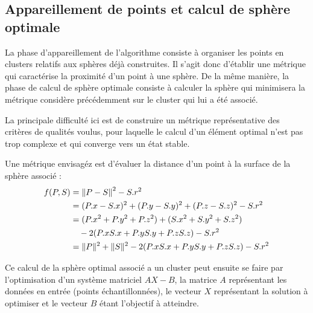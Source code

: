 \documentclass[10pt,a4paper,twoside, twocolumn]{report}
\begin{document}
\subsection{Appareillement de points et calcul de sphère optimale}

La phase d'appareillement de l'algorithme consiste à organiser les points en clusters relatifs aux sphères déjà construites. Il s’agit donc d’établir une métrique qui caractérise la proximité d'un point à une sphère. De la même manière, la phase de calcul de sphère optimale consiste à calculer la sphère qui minimisera la métrique considère précédemment sur le cluster qui lui a été associé.

La principale difficulté ici est de construire un métrique représentative des critères de qualités voulus, pour laquelle le calcul d'un élément optimal n'est pas trop complexe et qui converge vers un état stable.

Une métrique envisagéz est d'évaluer la distance d'un point à la surface de la sphère associé :
\begin{align}
	f(P, S) &= \left\|P-S\right\|^2 - S.r^2															\label{eq:metrique}	\\
					&= (P.x-S.x)^2 + (P.y-S.y)^2 + (P.z-S.z)^2 - S.r^2					\notag \\
					&= (P.x^2 + P.y^2+P.z^2) + (S.x^2+S.y^2+S.z^2)							\notag \\
					&\quad - 2(P.xS.x + P.yS.y + P.zS.z)  - S.r^2								\notag \\
					&= \|P\|^2 + \|S\|^2 - 2(P.xS.x + P.yS.y + P.zS.z) - S.r^2	\notag
\end{align}

Ce calcul de la sphère optimal associé a un cluster peut ensuite se faire par l'optimisation d'un système matriciel $AX-B$, la matrice $A$ représentant les données en entrée (points échantillonnées), le vecteur $X$ représentant la solution à optimiser et le vecteur $B$ étant l'objectif à atteindre.
\end{document}
